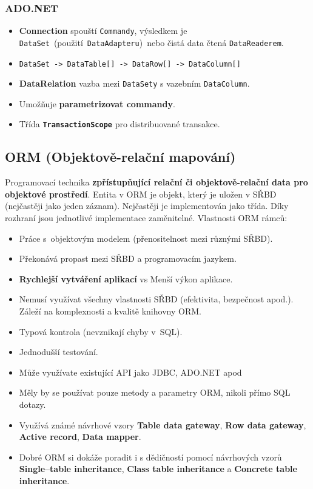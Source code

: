 \subsubsection{ADO.NET}
\begin{itemize}
\item \textbf{Connection} spouští \texttt{Commandy}, výsledkem je \texttt{DataSet} (použití \texttt{DataAdapteru}) nebo čistá data čtená \texttt{DataReaderem}.
\item \texttt{DataSet -> DataTable[] -> DataRow[] -> DataColumn[]}
\item \textbf{DataRelation} vazba mezi \texttt{DataSety} s vazebním \texttt{DataColumn}.
\item Umožňuje \textbf{parametrizovat commandy}.
\item Třída \textbf{\texttt{TransactionScope}} pro distribuované transakce.
\end{itemize}

\subsection{ORM (Objektově-relační mapování)}
Programovací technika \textbf{zpřístupňující relační či objektově-relační data pro objektové prostředí}. Entita v ORM je objekt, který je uložen v SŘBD (nejčastěji jako jeden záznam). Nejčastěji je implementován jako třída. Díky rozhraní jsou jednotlivé implementace zaměnitelné. Vlastnosti ORM rámců:
\begin{itemize} 
\item Práce s objektovým modelem (přenositelnost mezi různými SŘBD).
\item Překonává propast mezi SŘBD a programovacím jazykem.
\item \textbf{Rychlejší vytváření aplikací} vs Menší výkon aplikace.
\item Nemusí využívat všechny vlastnosti SŘBD (efektivita, bezpečnost apod.). Záleží na komplexnosti a kvalitě knihovny ORM.
\item Typová kontrola (nevznikají chyby v SQL).
\item Jednodušší testování.
\item Může využívate existující API jako JDBC, ADO.NET apod
\item Měly by se používat pouze metody a parametry ORM, nikoli přímo SQL dotazy.
\item Využívá známé návrhové vzory \textbf{Table data gateway}, \textbf{Row data gateway}, \textbf{Active record}, \textbf{Data mapper}.
\item Dobré ORM si dokáže poradit i s dědičností pomocí návrhových vzorů \textbf{Single--table inheritance}, \textbf{Class table inheritance} a \textbf{Concrete table inheritance}.
\end{itemize}

